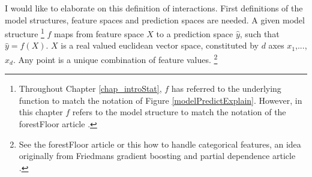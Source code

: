 I would like to elaborate on this definition of interactions. First definitions of the model structures, feature spaces and prediction spaces are needed. A given model structure
\footnote{Throughout Chapter \ref{chap_introStat}, $f$ has referred to the underlying function to match the notation of Figure \ref{modelPredictExplain}\cite{Mostafa2013learning}. However, in this chapter $f$ refers to the model structure to match the notation of the forestFloor article \cite{welling2016forest}.}
$f$ maps from feature space $X$ to a prediction space $\hat{y}$, such that $\hat{y} = f(X)$. $X$ is a real valued euclidean vector space, constituted by $d$ axes $x_1$,...,$x_d$. Any point is a unique combination of feature values.
\footnote{See the forestFloor article \cite{welling2016forest} or this how to handle categorical features, an idea originally from Friedmans gradient boosting and partial dependence article \cite{friedman2001greedy}.}
